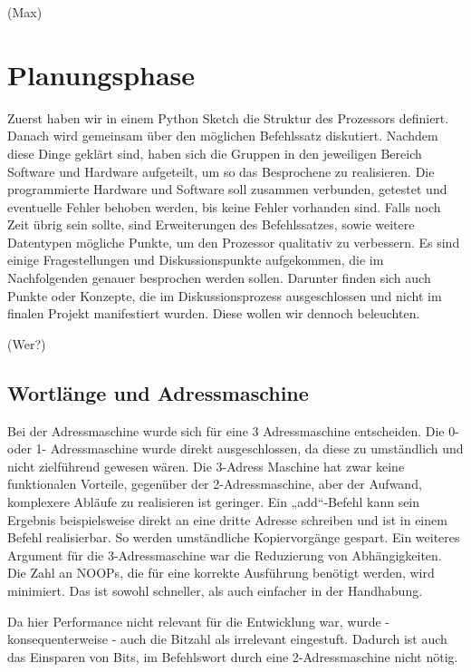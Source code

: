 \documentclass[paper=a4,fontsize=12pt,twocolumn]{scrreprt}
\begin{document}
(Max)

\chapter{Planungsphase}
Zuerst haben wir in einem Python Sketch die Struktur des Prozessors definiert.
Danach wird gemeinsam über den möglichen Befehlssatz diskutiert.
Nachdem diese Dinge geklärt sind, haben sich die Gruppen in den jeweiligen Bereich Software und Hardware aufgeteilt, um so das Besprochene zu realisieren.
Die programmierte Hardware und Software soll zusammen verbunden, getestet und eventuelle Fehler behoben werden, bis keine Fehler vorhanden sind.
Falls noch Zeit übrig sein sollte, sind Erweiterungen des Befehlssatzes, sowie weitere Datentypen mögliche Punkte, um den Prozessor qualitativ zu verbessern.
Es sind einige Fragestellungen und Diskussionspunkte aufgekommen, die im Nachfolgenden genauer besprochen werden sollen.
Darunter finden sich auch Punkte oder Konzepte, die im Diskussionsprozess ausgeschlossen und nicht im finalen Projekt manifestiert wurden.
Diese wollen wir dennoch beleuchten.

\kant[5]

(Wer?)



\section{Wortlänge und Adressmaschine}

Bei der Adressmaschine wurde sich für eine 3 Adressmaschine entscheiden.
Die 0- oder 1- Adressmaschine wurde direkt ausgeschlossen, da diese zu umständlich und nicht zielführend gewesen wären.
Die 3-Adress Maschine hat zwar keine funktionalen Vorteile, gegenüber der 2-Adressmaschine, aber der Aufwand, komplexere Abläufe zu realisieren ist geringer.
Ein „add“-Befehl kann sein Ergebnis beispielsweise direkt an eine dritte Adresse schreiben und ist in einem Befehl realisierbar.
So werden umständliche Kopiervorgänge gespart.
Ein weiteres Argument für die 3-Adressmaschine war die Reduzierung von Abhängigkeiten.
Die Zahl an NOOPs, die für eine korrekte Ausführung benötigt werden, wird minimiert.
Das ist sowohl schneller, als auch einfacher in der Handhabung.

Da hier Performance nicht relevant für die Entwicklung war, wurde - konsequenterweise - auch die Bitzahl als irrelevant eingestuft.
Dadurch ist auch das Einsparen von Bits, im Befehlswort durch eine 2-Adressmaschine nicht nötig.
\end{document}

